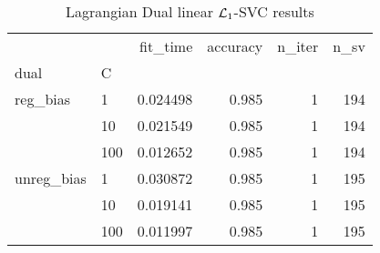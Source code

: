 \begin{table}[H]
\centering
\caption{Lagrangian Dual linear $\protect \mathcal{L}_1$-SVC results}
\label{linear_lagrangian_dual_l1_svc_cv_results}
\begin{tabular}{llrrrr}
\toprule
           &     &  fit\_time &  accuracy &  n\_iter &  n\_sv \\
dual & C &           &           &         &       \\
\midrule
reg\_bias & 1   &  0.024498 &     0.985 &       1 &   194 \\
           & 10  &  0.021549 &     0.985 &       1 &   194 \\
           & 100 &  0.012652 &     0.985 &       1 &   194 \\
unreg\_bias & 1   &  0.030872 &     0.985 &       1 &   195 \\
           & 10  &  0.019141 &     0.985 &       1 &   195 \\
           & 100 &  0.011997 &     0.985 &       1 &   195 \\
\bottomrule
\end{tabular}
\end{table}
